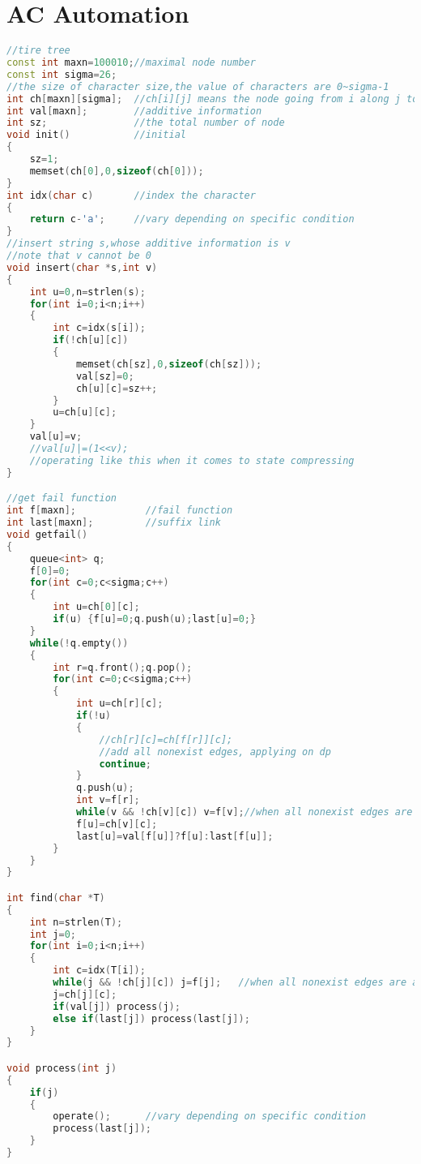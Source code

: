  \section{AC Automation}
 \begin{lstlisting}[language=C++]
//tire tree
const int maxn=100010;//maximal node number
const int sigma=26;   
//the size of character size,the value of characters are 0~sigma-1
int ch[maxn][sigma];  //ch[i][j] means the node going from i along j to
int val[maxn];        //additive information
int sz;               //the total number of node
void init()           //initial
{
    sz=1;
    memset(ch[0],0,sizeof(ch[0]));
}
int idx(char c)       //index the character
{
    return c-'a';     //vary depending on specific condition
}
//insert string s,whose additive information is v
//note that v cannot be 0
void insert(char *s,int v)
{
    int u=0,n=strlen(s);
    for(int i=0;i<n;i++)
    {
        int c=idx(s[i]);
        if(!ch[u][c])
        {
            memset(ch[sz],0,sizeof(ch[sz]));
            val[sz]=0;
            ch[u][c]=sz++;
        }
        u=ch[u][c];
    }
    val[u]=v;
    //val[u]|=(1<<v);
    //operating like this when it comes to state compressing
}

//get fail function
int f[maxn];            //fail function
int last[maxn];         //suffix link
void getfail()
{
    queue<int> q;
    f[0]=0;
    for(int c=0;c<sigma;c++)
    {
        int u=ch[0][c];
        if(u) {f[u]=0;q.push(u);last[u]=0;}
    }
    while(!q.empty())
    {
        int r=q.front();q.pop();
        for(int c=0;c<sigma;c++)
        {
            int u=ch[r][c];
            if(!u)
            {
                //ch[r][c]=ch[f[r]][c];
                //add all nonexist edges, applying on dp
                continue;
            }
            q.push(u);
            int v=f[r];
            while(v && !ch[v][c]) v=f[v];//when all nonexist edges are added, code here can be deleted
            f[u]=ch[v][c];
            last[u]=val[f[u]]?f[u]:last[f[u]];
        }
    }
}

int find(char *T)
{
    int n=strlen(T);
    int j=0;
    for(int i=0;i<n;i++)
    {
        int c=idx(T[i]);
        while(j && !ch[j][c]) j=f[j];   //when all nonexist edges are added, code here can be deleted
        j=ch[j][c];
        if(val[j]) process(j);
        else if(last[j]) process(last[j]);
    }
}

void process(int j)
{
    if(j)
    {
        operate();      //vary depending on specific condition
        process(last[j]);
    }
}
 \end{lstlisting}

